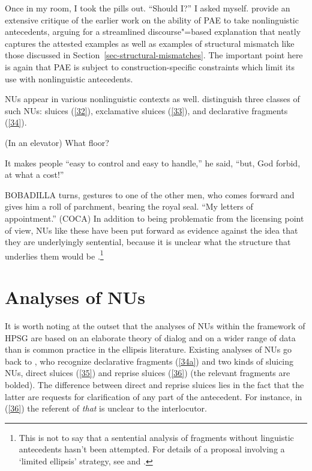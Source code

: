 \documentclass[output=paper
                ,modfonts
                ,nonflat
	        ,collection
	        ,collectionchapter
	        ,collectiontoclongg
 	        ,biblatex
                ,babelshorthands
                ,newtxmath
                ,draftmode
                ,colorlinks, citecolor=brown
]{./langsci/langscibook}
\begin{document}
{\ea Once in my room, I took the pills out. ``Should I?'' I asked myself. \citep[ex. 22a][]{Miller2014b}\label{31}\z
\citet{Miller2014b} provide an extensive critique of the earlier work on the ability of PAE to take nonlinguistic antecedents, arguing for a streamlined discourse"=based explanation that neatly captures the attested examples as well as examples of structural mismatch like those discussed in Section~\ref{sec-structural-mismatches}. The important point here is again that PAE is subject to construction-specific constraints which limit its use with nonlinguistic antecedents.

NUs appear in various nonlinguistic contexts as well. \citet{Ginzburg2018} distinguish three classes of such NUs: sluices (\ref{32}), exclamative sluices (\ref{33}), and declarative fragments (\ref{34}).

\ea (In an elevator) What floor? \citep[298]{Ginzburg:Sag:2000}\label{32}\z

\ea It makes people ``easy to control and easy to handle,'' he said, ``but, God forbid, at what a cost!''
\label{33}\z

\ea BOBADILLA turns, gestures to one of the other men, who comes forward and gives him a roll of parchment, bearing the royal seal. ``My letters of appointment.'' (COCA)\label{34}\z
In addition to being problematic from the licensing point of view, NUs like these have been put forward as evidence against the idea that they are underlyingly sentential, because it is unclear what the structure that underlies them would be \citep[see][]{Ginzburg:Sag:2000, CJ2005a, Stainton2006}.\footnote{This is not to say that a sentential analysis of fragments without linguistic antecedents hasn't been attempted. For details of a proposal involving a `limited ellipsis' strategy, see \citet{Merchant2005a} and \citet{Merchant2010}.}


\section{Analyses of NUs}
\label{sec-analyses-of-NUs}

It is worth noting at the outset that the analyses of NUs within the framework of HPSG are based on an elaborate theory of dialog \citep{Ginzburg1994, Ginzburg2004, Ginzburg2014a, Larsson2002, Purver2006, Fernandez2006, Fernandez2002, Fernandez2007, Ginzburg2010, Ginzburg2014b, Ginzburg2012, Ginzburg2013} and on a wider range of data than is common practice in the ellipsis literature. Existing analyses of NUs go back to \citet{Ginzburg:Sag:2000}, who recognize declarative fragments (\ref{34a}) and two kinds of sluicing NUs, direct sluices (\ref{35}) and reprise sluices (\ref{36}) (the relevant fragments are bolded). The difference between direct and reprise sluices lies in the fact that the latter are requests for clarification of any part of the antecedent. For instance, in (\ref{36}) the referent of \textit{that} is unclear to the interlocutor.

}
\end{document}
